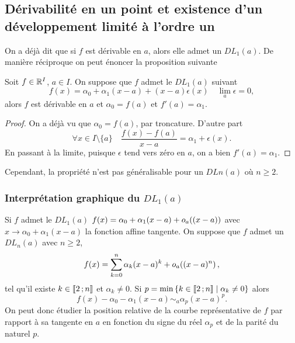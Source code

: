 \subsection{Dérivabilité en un point et existence d'un développement limité à 
l'ordre un}
On a déjà dit que si \(f\) est dérivable en \(a\), alors elle admet un 
\(DL_1(a)\). De manière réciproque on peut énoncer la proposition suivante
\begin{prop}
  Soit \(f \in \mathbb{R}^I\), \(a \in I\). On suppose que \(f\) admet le \(DL_1(a)\) 
  suivant
  \begin{equation}
    f(x)=\alpha_0 +\alpha_1(x-a) +(x-a) \epsilon(x) \quad \lim_a \epsilon =0,
  \end{equation}
  alors \(f\) est dérivable en \(a\) et \(\alpha_0=f(a)\) et \(f'(a)=\alpha_1\).
\end{prop}
\begin{proof}
  On a déjà vu que \(\alpha_0=f(a)\), par troncature. D'autre part
  \begin{equation}
    \forall x \in I\setminus\{a\} \quad \frac{f(x)-f(a)}{x-a} = \alpha_1 
    +\epsilon(x).
  \end{equation}
  En passant à la limite, puisque \(\epsilon\) tend vers zéro en \(a\), on a 
  bien \(f'(a)=\alpha_1\).
\end{proof}
Cependant, la propriété n'est pas généralisable pour un \(DLn(a)\) où \(n 
\geqslant 2\).

\subsubsection{Interprétation graphique du \(DL_1(a)\)}

Si \(f\) admet le \(DL_1(a)\) \(f(x)=\alpha_0 +\alpha_1(x-a) 
+o\mathopen{}_{a}\left((x-a)\right)\) avec \(x \longrightarrow \alpha_0 +\alpha_1(x-a)\) la 
fonction affine tangente. On suppose que \(f\) admet un \(DL_n(a)\) avec \(n 
\geqslant 2\),
\begin{equation}
  f(x) = \sum_{k=0}^n \alpha_k (x-a)^k +o\mathopen{}_{a}\left((x-a)^n\right),
\end{equation}
tel qu'il existe \(k \in \mathopen{\llbracket}2\mathclose{}\mathpunct{};n\mathclose{\rrbracket}\) et \(\alpha_k \neq 0\). Si 
\(p=\min\left\{k \in \mathopen{\llbracket}2\mathclose{}\mathpunct{};n\mathclose{\rrbracket}\mathrel{}\middle|\mathrel{}\alpha_k \neq 0\right\}\) alors
\begin{equation}
  f(x) - \alpha_0 - \alpha_1(x-a) \sim_a \alpha_p (x-a)^p.
\end{equation}
On peut donc étudier la position relative de la courbe représentative de \(f\) 
par rapport à sa tangente en \(a\) en fonction du signe du réel \(\alpha_p\) et 
de la parité du naturel \(p\).

